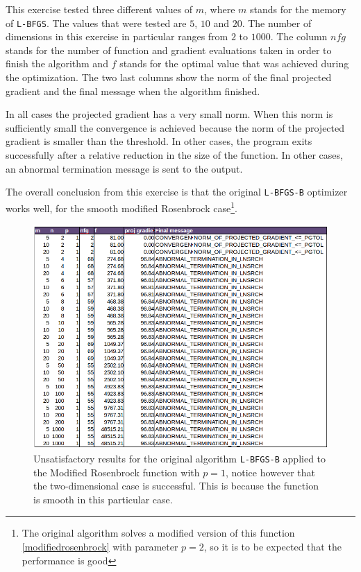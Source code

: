 This exercise tested three different values of $m$, where $m$ stands for the memory of \texttt{L-BFGS}. The values that were tested are $5$, $10$ and $20$. The number of dimensions in this exercise in particular ranges from $2$ to $1000$. The column $nfg$ stands for the number of function and gradient evaluations taken in order to finish the algorithm and $f$ stands for the optimal value that was achieved during the optimization. The two last columns show the norm of the final projected gradient and the final message when the algorithm finished.

In all cases the projected gradient has a very small norm. When this norm is sufficiently small the convergence is achieved because the norm of the projected gradient is smaller than the threshold. In other cases, the program exits successfully after a relative reduction in the size of the function. In other cases, an abnormal termination message is sent to the output.

The overall conclusion from this exercise is that the original \texttt{L-BFGS-B} optimizer works well, for the smooth modified Rosenbrock case\footnote{The original algorithm solves a modified version of this function \eqref{modifiedrosenbrock} with parameter $p = 2$, so it is to be expected that the performance is good}.

\begin{figure}
\begin{center}
\includegraphics[scale=0.5]{Figures/abnormalNocedal.png}
\caption[Modified Rosenbrock with $p = 1$]{Unsatisfactory results for the original algorithm \texttt{L-BFGS-B} applied to the Modified Rosenbrock function with $p = 1$, notice however that the two-dimensional case is successful.  This is because the function is smooth in this particular case.}
\label{pequal1}
\end{center}
\end{figure}

